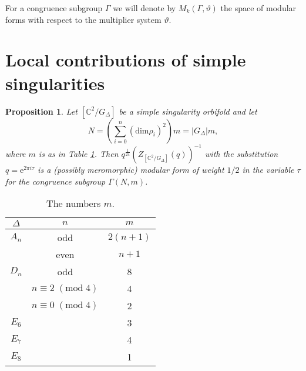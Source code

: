 \documentclass[11pt,a4paper]{amsart}
\newtheorem{proposition}[theorem]{Proposition}
\theoremstyle{definition}
\newcommand{\SC}{\mathbb{C}}                    %
\begin{document}
For a congruence subgroup $\Gamma$ we will denote by $ M_k(\Gamma, \vartheta)$ the space of modular forms with respect to the multiplier system $\vartheta$. 





\section{Local contributions of simple singularities}
\label{sec:loccontr}


\begin{proposition}
\label{prop:locmod}
 Let $[\SC^2/G_\Delta]$ be a simple singularity orbifold and let 
 \[N=\left(\sum_{i=0}^n (\mathrm{dim} \rho_i)^2\right)m=|G_\Delta|m,\]
 where  $m$ is as in Table \ref{table:congorder}. 
 Then $q^{\frac{1}{24}}(Z_{[\SC^2/G_\Delta]}(q))^{-1}$ with the substitution $q=\mathrm{e}^{2 \pi i \tau}$ is a (possibly meromorphic) modular form of weight $1/2$ in the variable $\tau$ for the congruence subgroup $\Gamma(N,m)$.
\end{proposition}


\begin{table}
	\begin{tabular}{ |c|c|c| }
		\hline
		$\Delta$ & $n$ & $m$ \\
		\hline
		$A_n$ & odd & $2(n+1)$ \\
		& even & $n+1$ \\
		$D_n$ & odd & 8 \\
		& $n \equiv 2\;(\mathrm{mod}\;4)$ & 4 \\
		& $n \equiv 0\;(\mathrm{mod}\;4)$ & 2 \\
		$E_6$ & & 3 \\
		$E_7$ & & 4 \\
		$E_8$ & & 1 \\
		\hline
	\end{tabular}
	\vspace{0.2in}
	\caption{The numbers $m$.}
	\label{table:congorder}
\end{table}
\end{document}
